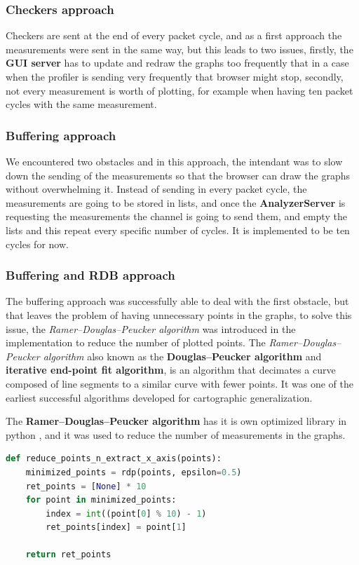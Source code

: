\subsubsection{Checkers approach}
Checkers are sent at the end of every packet cycle, and as a first approach the measurements were sent
in the same way, but this leads to two issues, firstly, the \textbf{GUI server} has to update and redraw
the graphs too frequently that in a case when the profiler is sending very frequently that browser might
stop, secondly, not every measurement is worth of plotting, for example when having ten packet cycles with
the same measurement.

\subsubsection{Buffering approach}
We encountered two obstacles and in this approach, the intendant was to slow down the sending of the measurements
so that the browser can draw the graphs without overwhelming it. Instead of sending in every packet cycle,
the measurements are going to be stored in lists, and once the \textbf{AnalyzerServer} is requesting the measurements
the channel is going to send them, and empty the lists and this repeat every specific number of cycles. It is
implemented to be ten cycles for now.

\subsubsection{Buffering and RDB approach}
The buffering approach was successfully able to deal with the first obstacle, but that leaves the problem of
having unnecessary points in the graphs, to solve this issue, the \textit{Ramer–Douglas–Peucker algorithm} was introduced
in the implementation to reduce the number of plotted points. The \textit{Ramer–Douglas–Peucker algorithm}
also known as the \textbf{Douglas–Peucker algorithm} and \textbf{iterative end-point fit algorithm}, 
is an algorithm that decimates a curve composed of line segments to a similar curve with fewer points. 
It was one of the earliest successful algorithms developed for cartographic generalization. \cite{rdp}

The \textbf{Ramer–Douglas–Peucker algorithm} has it is own optimized library in python \cite{rdp_library},
and it was used to reduce the number of measurements in the graphs.
\newline
\begin{lstlisting}[language=python, label=code:rdp, caption={using rdp to reduce points},captionpos=b]
def reduce_points_n_extract_x_axis(points):
    minimized_points = rdp(points, epsilon=0.5)
    ret_points = [None] * 10
    for point in minimized_points:
        index = int((point[0] % 10) - 1)
        ret_points[index] = point[1]

    return ret_points
\end{lstlisting}

